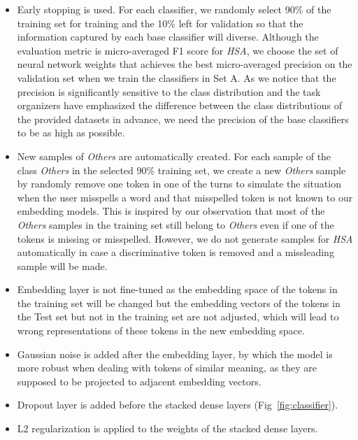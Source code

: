\documentclass[11pt,a4paper]{article}
\begin{document}
\begin{itemize}

\item Early stopping is used. For each classifier, we randomly select 90\% of the training set for training and the 10\% left for validation so that the information captured by each base classifier will diverse. Although the evaluation metric is micro-averaged F1 score for {\em HSA}, we choose the set of neural network weights that achieves the best micro-averaged precision on the validation set when we train the classifiers in Set A. As we notice that the precision is significantly sensitive to the class distribution and the task organizers have emphasized the difference between the class distributions of the provided datasets in advance, we need the precision of the base classifiers to be as high as possible.

\item New samples of {\em Others} are automatically created. For each sample of the class {\em Others} in the selected 90\% training set, we create a new {\em Others} sample by randomly remove one token in one of the turns to simulate the situation when the user misspells a word and that misspelled token is not known to our embedding models. This is inspired by our observation that most of the {\em Others} samples in the training set still belong to {\em Others} even if one of the tokens is missing or misspelled. However, we do not generate samples for {\em HSA} automatically in case a discriminative token is removed and a missleading sample will be made.

\item Embedding layer is not fine-tuned as the embedding space of the tokens in the training set will be changed but the embedding vectors of the tokens in the Test set but not in the training set are not adjusted, which will lead to wrong representations of these tokens in the new embedding space.

\item Gaussian noise is added after the embedding layer, by which the model is more robust when dealing with tokens of similar meaning, as they are supposed to be projected to adjacent embedding vectors.

\item Dropout \cite{Srivastava2014Dropout} layer is added before the stacked dense layers (Fig~\ref{fig:classifier}).

\item L2 regularization is applied to the weights of the stacked dense layers.

\end{itemize}
\end{document}
